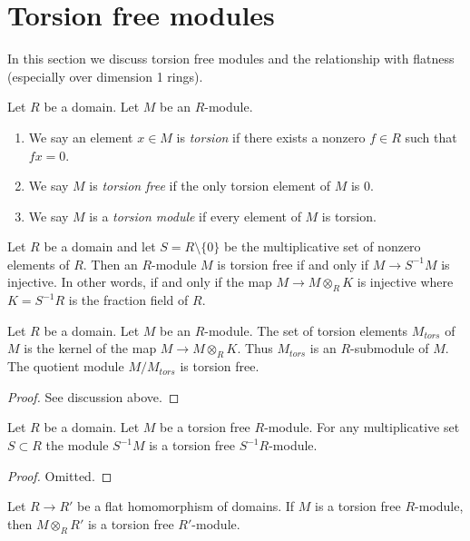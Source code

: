 \section{Torsion free modules}
\label{section-torsion-flat}

\noindent
In this section we discuss torsion free modules and the relationship
with flatness (especially over dimension 1 rings).

\begin{definition}
\label{definition-torsion}
Let $R$ be a domain. Let $M$ be an $R$-module.
\begin{enumerate}
\item We say an element $x \in M$ is {\it torsion} if there exists
a nonzero $f \in R$ such that $fx = 0$.
\item We say $M$ is {\it torsion free} if the only torsion element of $M$
is $0$.
\item We say $M$ is a {\it torsion module} if every element of $M$
is torsion.
\end{enumerate}
\end{definition}

\noindent
Let $R$ be a domain and let $S = R \setminus \{0\}$ be the multiplicative
set of nonzero elements of $R$. Then an $R$-module $M$ is torsion free if
and only if $M \to S^{-1}M$ is injective. In other words, if and only if
the map $M \to M \otimes_R K$ is injective where $K = S^{-1}R$ is the fraction
field of $R$.

\begin{lemma}
\label{lemma-torsion}
Let $R$ be a domain. Let $M$ be an $R$-module. The set of torsion elements
$M_{tors}$ of $M$ is the kernel of the map $M \to M \otimes_R K$.
Thus $M_{tors}$ is an $R$-submodule of $M$.
The quotient module $M/M_{tors}$ is torsion free.
\end{lemma}

\begin{proof}
See discussion above.
\end{proof}

\begin{lemma}
\label{lemma-localize-torsion}
Let $R$ be a domain. Let $M$ be a torsion free $R$-module.
For any multiplicative set $S \subset R$ the module
$S^{-1}M$ is a torsion free $S^{-1}R$-module.
\end{lemma}

\begin{proof}
Omitted.
\end{proof}

\begin{lemma}
\label{lemma-flat-pullback-torsion}
Let $R \to R'$ be a flat homomorphism of domains. If $M$ is a torsion
free $R$-module, then $M \otimes_R R'$ is a torsion free $R'$-module.
\end{lemma}

